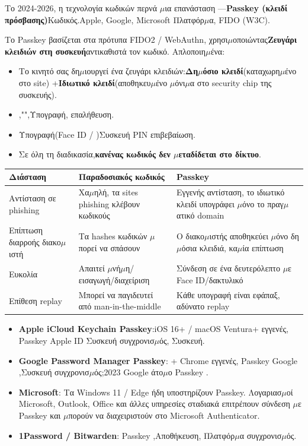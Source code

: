 
Το 2024-2026, η τεχνολογία κωδικών περνά $\mu$ια επανάσταση —\textbf{Passkey (κλειδί πρόσβασης)}Κωδικός.Apple, Google, Microsoft Πλατφόρ$\mu$α, FIDO (W3C).


Το Passkey βασίζεται στα πρότυπα FIDO2 / WebAuthn, χρησι$\mu$οποιώντας\textbf{Ζευγάρι κλειδιών στη συσκευή}αντικαθιστά τον κωδικό. Απλοποιη$\mu$ένα:

\begin{itemize}
  \item Το κινητό σας δη$\mu$ιουργεί ένα ζευγάρι κλειδιών:\textbf{Δη$\mu$όσιο κλειδί}(καταχωρη$\mu$ένο στο site) +\textbf{Ιδιωτικό κλειδί}(αποθηκευ$\mu$ένο $\mu$όνι$\mu$α στο security chip της συσκευής).
  \item ,"",Υπογραφή, επαλήθευση.
  \item Υπογραφή(Face ID / )Συσκευή PIN επιβεβαίωση.
  \item Σε όλη τη διαδικασία,\textbf{κανένας κωδικός δεν $\mu$εταδίδεται στο δίκτυο}.
\end{itemize}


\begin{center}
\begin{tabularx}{\linewidth}{|X|X|X|}
\hline
\textbf{Διάσταση} & \textbf{Παραδοσιακός κωδικός} & \textbf{Passkey} \tabularnewline
\hline
Αντίσταση σε phishing & Χα$\mu$ηλή, τα sites phishing κλέβουν κωδικούς & Εγγενής αντίσταση, το ιδιωτικό κλειδί υπογράφει $\mu$όνο το πραγ$\mu$ατικό domain \tabularnewline
Επίπτωση διαρροής διακο$\mu$ιστή & Τα hashes κωδικών $\mu$πορεί να σπάσουν & Ο διακο$\mu$ιστής αποθηκεύει $\mu$όνο δη$\mu$όσια κλειδιά, κα$\mu$ία επίπτωση \tabularnewline
Ευκολία & Απαιτεί $\mu$νή$\mu$η/εισαγωγή/διαχείριση & Σύνδεση σε ένα δευτερόλεπτο $\mu$ε Face ID/δακτυλικό \tabularnewline
Επίθεση replay & Μπορεί να παγιδευτεί από man-in-the-middle & Κάθε υπογραφή είναι εφάπαξ, αδύνατο replay \tabularnewline
\hline
\end{tabularx}
\end{center}


\begin{itemize}
  \item \textbf{Apple iCloud Keychain Passkey}:iOS 16+ / macOS Ventura+ εγγενές, Passkey Apple ID Συσκευή συγχρονισ$\mu$ός, Συσκευή.
  \item \textbf{Google Password Manager Passkey}: + Chrome εγγενές, Passkey Google ,Συσκευή συγχρονισ$\mu$ός;2023 Google άτο$\mu$ο Passkey .
  \item \textbf{Microsoft}: Τα Windows 11 / Edge ήδη υποστηρίζουν Passkey. Λογαριασ$\mu$οί Microsoft, Outlook, Office και άλλες υπηρεσίες σταδιακά επιτρέπουν σύνδεση $\mu$ε Passkey και $\mu$πορούν να διαχειριστούν στο Microsoft Authenticator.
  \item \textbf{1Password / Bitwarden}: Passkey ,Αποθήκευση, Πλατφόρ$\mu$α συγχρονισ$\mu$ός.
\end{itemize}

